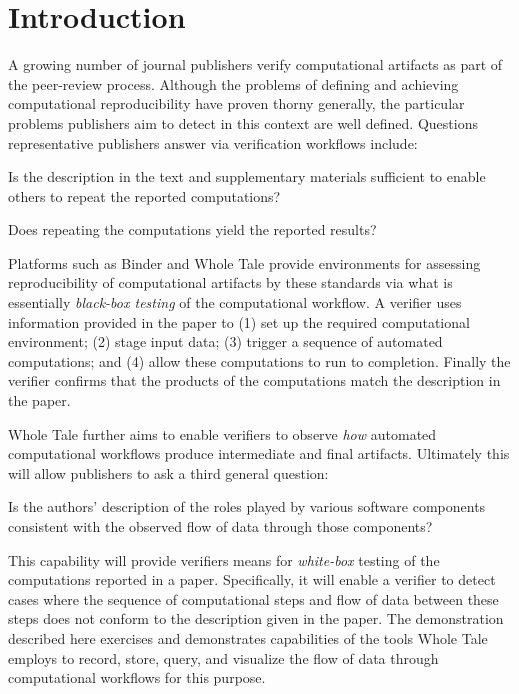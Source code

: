 \section{Introduction}

A growing number of journal publishers verify computational artifacts as part of the peer-review process. Although the problems of defining and achieving computational reproducibility have proven thorny generally, the particular problems publishers aim to detect in this context are well defined. Questions representative publishers answer via verification workflows include:

\begin{itemize}

\tinyitem Is the description in the text and supplementary materials sufficient to enable others to repeat the reported computations?

\tinyitem Does repeating the computations yield the reported results?

\end{itemize}

Platforms such as Binder \cite{Binder_2018} and Whole Tale  \cite{brinckman2019computing} provide environments for assessing reproducibility of computational artifacts by these standards via what is essentially \emph{black-box testing} of the computational workflow. A verifier uses information provided in the paper to (1) set up the required computational environment; (2) stage input data; (3) trigger a sequence of automated computations; and (4) allow these computations to run to completion. Finally the verifier confirms that the products of the computations match the description in the paper.

Whole Tale further aims to enable verifiers to observe \emph{how} automated computational workflows produce intermediate and final artifacts. Ultimately this will allow publishers to ask a third general question:

\begin{itemize}

\tinyitem Is the authors' description of the roles played by various software components consistent with the observed flow of data through those components?

\end{itemize}

This capability will provide verifiers means for \emph{white-box} testing of the computations reported in a paper. Specifically, it will enable a verifier to detect cases where the sequence of computational steps and flow of data between these steps does not conform to the description given in the paper. The demonstration described here exercises and demonstrates capabilities of the tools Whole Tale employs to record, store, query, and visualize the flow of data through computational workflows for this purpose.








